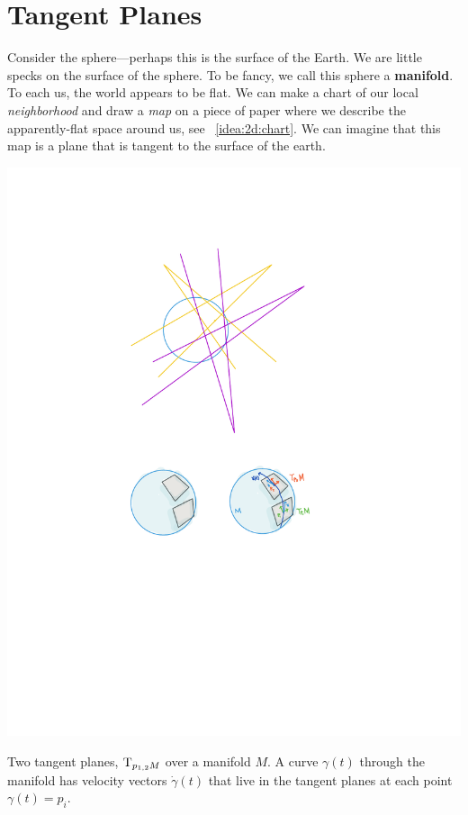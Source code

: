 \documentclass[12pt, oneside]{report}    %
\let\oldsection\section
\def\section{%
  \setcounter{sidenote}{1}%
  \oldsection
}
\begin{document}
\section{Tangent Planes}


Consider the sphere---perhaps this is the surface of the Earth. We are little specks on the surface of the sphere. To be fancy, we call this sphere a \textbf{manifold}. To each us, the world appears to be flat. We can make a chart of our local \emph{neighborhood} and draw a \emph{map} on a piece of paper where we describe the apparently-flat space around us, see \bigidearef{}~\ref{idea:2d:chart}. We can imagine that this map is a plane that is tangent to the surface of the earth.
% 
\begin{marginfigure}%
    \includegraphics[width=\textwidth]{figures/TangentBundle.pdf}
    \caption{Two tangent planes, $\textnormal{T}_{p_{1,2}M}$ over a manifold $M$. A curve $\gamma(t)$ through the manifold has velocity vectors $\dot{\gamma}(t)$ that live in the tangent planes at each point $\gamma(t)=p_i$.}
    \label{fig:tangent:bundle:sphere}
\end{marginfigure}
% 
\end{document}
